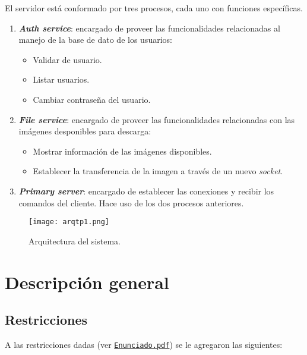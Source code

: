 \documentclass[12pt,a4paper]{article}
\begin{document}
El servidor está conformado por tres procesos, cada uno con funciones específicas.

\begin{enumerate}[leftmargin=1.5cm]
  \item \textbf{\emph{Auth service}}: encargado de proveer las funcionalidades relacionadas
  al manejo de la base de dato de los usuarios:

  \begin{itemize}[leftmargin=1cm, nosep]
    \item Validar de usuario.
    \item Listar usuarios.
    \item Cambiar contraseña del usuario.
  \end{itemize}

  \item \textbf{\emph{File service}}: encargado de proveer las funcionalidades relacionadas
  con las imágenes desponibles para descarga:

  \begin{itemize}[leftmargin=1cm, nosep]
    \item Mostrar información de las imágenes disponibles.
    \item Establecer la transferencia de la imagen a través de un nuevo
    \emph{socket}.
  \end{itemize}

  \item \textbf{\emph{Primary server}}: encargado de establecer las conexiones y recibir
  los comandos del cliente. Hace uso de los dos procesos anteriores.
\end{enumerate}

\begin{figure}[H]
  \centering
  \texttt{[image: arqtp1.png]}
  \caption{Arquitectura del sistema.}
  \label{arqui}
\end{figure}

\newpage

\section{Descripción general}
\label{desc}

\subsection{Restricciones}
\label{restrictions}
A las restricciones dadas (ver \href{run:../Enunciado.pdf}
{\texttt{Enunciado.pdf}}) se le agregaron las siguientes:
\end{document}
